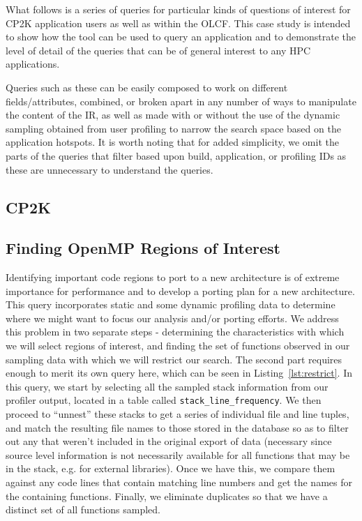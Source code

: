 What follows is a series of queries for particular kinds of questions of interest for CP2K 
application users as well as within the \ac{OLCF}.
This case study is intended to show how the tool can be used to query an application and to 
demonstrate the level of detail of the queries that can be of general interest to any \acs{HPC} 
applications.

Queries such as these can be easily composed to work on different fields/attributes, combined, or 
broken apart in any number of ways to manipulate the content of the \ac{IR}, as well as made with or 
without the use of the dynamic sampling obtained from user profiling to narrow the 
search space based on the application hotspots.
It is worth noting that for added simplicity, we omit the parts of the queries that filter based upon 
build, application, or profiling IDs as these are unnecessary to understand the queries.

\subsection{CP2K}
\label{sec:cp2k}


\subsection{Finding OpenMP Regions of Interest}
Identifying important code regions to port to a new architecture is of extreme importance
for performance and to develop a porting plan for a new architecture.
This query incorporates static and some dynamic profiling 
data to determine where we might want to focus our analysis and/or porting efforts.
We address this problem in two separate steps - determining the characteristics with which we will 
select regions of interest, and finding the set of functions observed in our sampling data with which 
we will restrict our search.
The second part requires enough to merit its own query here, which can be seen in 
Listing~\ref{lst:restrict}.
In this query, we start by selecting all the sampled stack information from our profiler output, located 
in a table called \texttt{stack\_line\_frequency}.
We then proceed to ``unnest'' these stacks to get a series of individual file and line tuples, and match 
the resulting file names to those stored in the database so as to filter out any that weren't included in 
the original export of data (necessary since source level information is not necessarily available for 
all functions that may be in the stack, e.g. for external libraries).
Once we have this, we compare them against any code lines that contain matching line numbers and 
get the names for the containing functions.
Finally, we eliminate duplicates so that we have a distinct set of all functions sampled.

